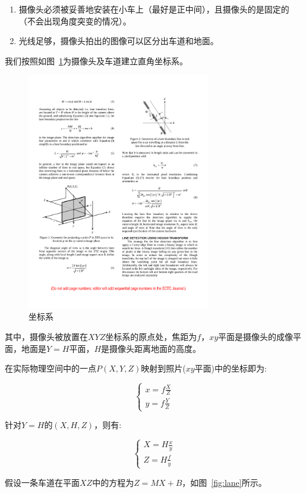\documentclass[11pt]{article}
\begin{document}
\begin{enumerate}
  \item[(1)] 摄像头必须被妥善地安装在小车上（最好是正中间），且摄像头的是固定的（不会出现角度突变的情况）。
  \item[(2)] 光线足够，摄像头拍出的图像可以区分出车道和地面。
\end{enumerate}

我们按照如图~\ref{fig:coordinate-system}为摄像头及车道建立直角坐标系。

\begin{figure}[h!]
	\centering
	\includegraphics[width=8cm]{Graphs/coordinate-system}
	\caption{坐标系}
	\label{fig:coordinate-system}
\end{figure}

其中，摄像头被放置在$XYZ$坐标系的原点处，焦距为$f$，$xy$平面是摄像头的成像平面，地面是$Y=H$平面，$H$是摄像头距离地面的高度。

在实际物理空间中的一点$P(X,Y,Z)$映射到照片($xy$平面)中的坐标即为:

$$
\begin{cases}
  x = f \frac{X}{Z} \\
  y = f \frac{Y}{Z}
\end{cases}
$$

针对$Y=H$的$(X, H, Z)$，则有:

$$
\begin{cases}
  X = H\frac{x}{y} \\
  Z = H\frac{f}{y}
\end{cases}
$$

假设一条车道在平面$XZ$中的方程为$Z = MX + B$，如图~\ref{fig:lane}所示。
\end{document}
